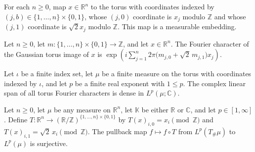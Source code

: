 \begin{lemma}
\label{BooleanAnalysis.GaussianSpace.measurableEmbedding_gaussianTorusMap}
\leanok
{}
For each $n\ge0$, map $x\in\mathbb R^n$ to the torus with coordinates indexed by
$(j,b)\in\{1,\ldots,n\}\times\{0,1\}$, whose $(j,0)$ coordinate is $x_j$ modulo $\mathbb
Z$ and whose $(j,1)$ coordinate is $\sqrt2 x_j$ modulo $\mathbb Z$. This map is a
measurable embedding.
\end{lemma}

\begin{lemma}
\label{BooleanAnalysis.GaussianSpace.mFourier_gaussianTorusMap}
\leanok
{}
Let $n\ge 0$, let $m:\{1,\ldots,n\}\times\{0,1\}\to\mathbb Z$, and let $x\in\mathbb
R^n$. The Fourier character of the Gaussian torus image of $x$ is
$\exp\!\left(i\sum_{j=1}^n2\pi\bigl(m_{j,0}+\sqrt2\,m_{j,1}\bigr)x_j\right)$.
\end{lemma}

\begin{lemma}
\label{BooleanAnalysis.GaussianSpace.span_mFourier_toLp_dense}
\leanok
{}
Let $\iota$ be a finite index set, let $\mu$ be a finite measure on the torus with
coordinates indexed by $\iota$, and let $p$ be a finite real exponent with $1\le p$. The
complex linear span of all torus Fourier characters is dense in $L^p(\mu;\mathbb C)$.
\end{lemma}

\begin{lemma}
\label{BooleanAnalysis.GaussianSpace.surjective_gaussianTorus_pullback}
\leanok
{}
Let $n\ge0$, let $\mu$ be any measure on $\mathbb R^n$, let $\mathbb K$ be either
$\mathbb R$ or $\mathbb C$, and let $p\in[1,\infty]$. Define $T:\mathbb R^n\to(\mathbb
R/\mathbb Z)^{\{1,\ldots,n\}\times\{0,1\}}$ by $T(x)_{i,0}=x_i\pmod{\mathbb Z}$ and
$T(x)_{i,1}=\sqrt2\,x_i\pmod{\mathbb Z}$. The pullback map $f\mapsto f\circ T$ from
$L^p(T_\#\mu)$ to $L^p(\mu)$ is surjective.
\end{lemma}

